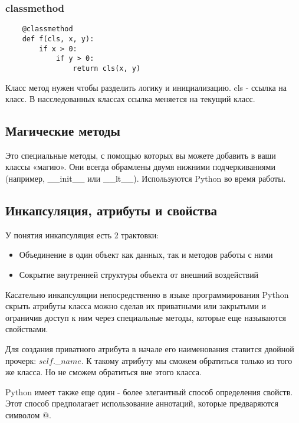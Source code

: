 \documentclass[12pt, a4paper]{article}
\begin{document}
\subsubsection{classmethod}

\begin{verbatim}
    @classmethod
    def f(cls, x, y):
        if x > 0:
            if y > 0:
                return cls(x, y)
\end{verbatim}

Класс метод нужен чтобы разделить логику и инициализацию. cls - ссылка на класс. В насследованных классах ссылка меняется на текущий класс.

\subsection{Магические методы}

Это специальные методы, с помощью которых вы можете добавить в ваши классы «магию». Они всегда обрамлены двумя нижними подчеркиваниями (например, \_\_init\_\_ или \_\_lt\_\_). Используются Python во время работы.

\subsection{Инкапсуляция, атрибуты и свойства}

У понятия инкапсуляция есть 2 трактовки:

 \begin{itemize}
    \item Объединение в один объект как данных, так и методов работы с ними
    \item Сокрытие внутренней структуры объекта от внешний воздействий
 \end{itemize}

Касательно инкапсуляции непосредственно в языке программирования Python скрыть атрибуты класса можно сделав их приватными или закрытыми и ограничив доступ к ним через специальные методы, которые еще называются свойствами.

\vspace{1em}

Для создания приватного атрибута в начале его наименования ставится двойной прочерк: $self.\_\_name$. К такому атрибуту мы сможем обратиться только из того же класса. Но не сможем обратиться вне этого класса.

\vspace{1em}

Python имеет также еще один - более элегантный способ определения свойств. Этот способ предполагает использование аннотаций, которые предваряются символом @.
\end{document}
